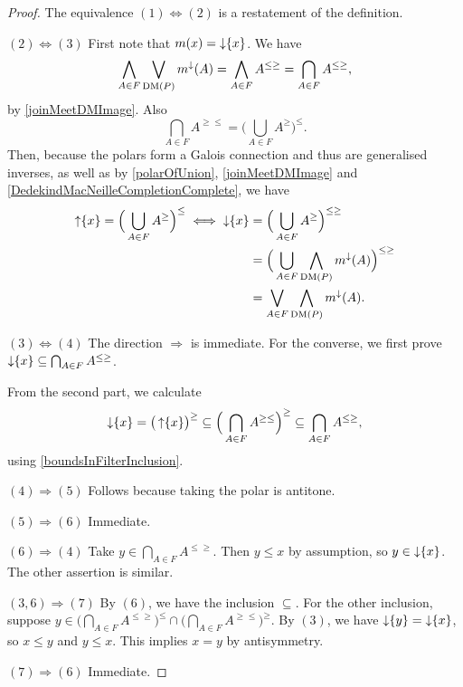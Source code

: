 \begin{proof}
The equivalence $(1) \Leftrightarrow (2)$ is a restatement of the definition.

$(2) \Leftrightarrow (3)$ First note that $m(x) = \operatorname{\downarrow} \{x\}$. We have
\[ \bigwedge_{A\in F}\bigvee_{\operatorname{DM}(P)} m^\downarrow(A) = \bigwedge_{A\in F}A^{\leq\geq} = \bigcap_{A\in F}A^{\leq\geq}, \]
by \ref{joinMeetDMImage}. Also
\[ \bigcap_{A\in F}A^{\geq\leq} = \Big(\bigcup_{A\in F}A^\geq\Big)^\leq. \]
Then, because the polars form a Galois connection and thus are generalised inverses, as well as by \ref{polarOfUnion}, \ref{joinMeetDMImage} and \ref{DedekindMacNeilleCompletionComplete}, we have
\begin{align*}
\operatorname{\uparrow}\{x\} = \Big(\bigcup_{A\in F}A^\geq\Big)^\leq \iff \operatorname{\downarrow}\{x\} &= \Big(\bigcup_{A\in F}A^\geq\Big)^{\leq\geq} \\
&= \Big(\bigcup_{A\in F}\bigwedge_{\operatorname{DM}(P)}m^\downarrow(A)\Big)^{\leq\geq} \\
&= \bigvee_{A\in F}\bigwedge_{\operatorname{DM}(P)} m^\downarrow(A).
\end{align*}

$(3) \Leftrightarrow (4)$ The direction $\Rightarrow$ is immediate. For the converse, we first prove $\operatorname{\downarrow} \{x\}\subseteq \bigcap_{A\in F}A^{\leq \geq}$.

From the second part, we calculate
\[ \operatorname{\downarrow}\{x\} = \big(\operatorname{\uparrow}\{x\}\big)^\geq \subseteq \Big(\bigcap_{A\in F}A^{\geq\leq}\Big)^\geq \subseteq \bigcap_{A\in F}A^{\leq\geq}, \]
using \ref{boundsInFilterInclusion}.

$(4) \Rightarrow (5)$ Follows because taking the polar is antitone.

$(5) \Rightarrow (6)$ Immediate.

$(6) \Rightarrow (4)$ Take $y\in \bigcap_{A\in F} A^{\leq \geq}$. Then $y\leq x$ by assumption, so $y\in \operatorname{\downarrow}\{x\}$. The other assertion is similar.

$(3,6) \Rightarrow (7)$ By $(6)$, we have the inclusion $\subseteq$. For the other inclusion, suppose $y\in \Big(\bigcap_{A\in F}A^{\leq \geq}\Big)^\leq \cap \Big(\bigcap_{A\in F}A^{\geq\leq}\Big)^\geq$. By $(3)$, we have $\operatorname{\downarrow}\{y\} = \operatorname{\downarrow}\{x\}$, so $x\leq y$ and $y \leq x$. This implies $x=y$ by antisymmetry.

$(7) \Rightarrow (6)$ Immediate.
\end{proof}


